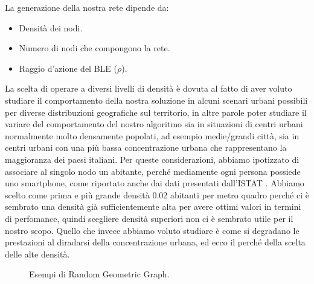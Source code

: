 \begin{flushleft}
	La generazione della nostra rete dipende da:
\end{flushleft}
\begin{itemize}
	\item Densità dei nodi.
	\item Numero di nodi che compongono la rete.
	\item Raggio d'azione del \acs{BLE} (\textit{$\rho$}).
\end{itemize}
La scelta di operare a diversi livelli di densità è dovuta al fatto di aver voluto studiare il comportamento della nostra soluzione in alcuni scenari urbani possibili per diverse distribuzioni geografiche sul territorio, in altre parole poter studiare il variare del comportamento del nostro algoritmo sia in situazioni di centri urbani normalmente molto densamente popolati, ad esempio medie/grandi città, sia in centri urbani con una più bassa concentrazione urbana che rappresentano la maggioranza dei paesi italiani.
Per queste considerazioni, abbiamo ipotizzato di associare al singolo nodo un abitante, perché mediamente ogni persona possiede uno smartphone, come riportato anche dai dati presentati dall'ISTAT \cite{istat2014}. Abbiamo scelto come prima e più grande densità 0.02 abitanti per metro quadro perché ci è sembrato una densità già sufficientemente alta per avere ottimi valori in termini di perfomance, quindi scegliere densità superiori non ci è sembrato utile per il nostro scopo. Quello che invece abbiamo voluto studiare è come si degradano le prestazioni al diradarsi della concentrazione urbana, ed ecco il perché della scelta delle alte densità.
\bigskip
\begin{figure}[t]
	\hfill
	\caption{Esempi di Random Geometric Graph.}
	\label{fig:rgg_gen_02}
\end{figure}
